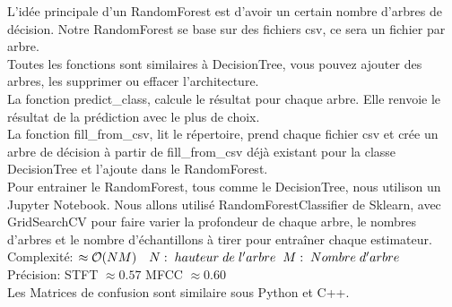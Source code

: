 \documentclass[10pt]{article}
\begin{document}
\begin{minipage}[t]{0.6\linewidth}
L'idée principale d'un RandomForest est d'avoir un certain nombre d'arbres de décision. Notre RandomForest se base sur des fichiers csv, ce sera un fichier par arbre.\\

Toutes les fonctions sont similaires à DecisionTree, vous pouvez ajouter des arbres, les supprimer ou effacer l'architecture.\\
La fonction predict\_class, calcule le résultat pour chaque arbre. Elle renvoie le résultat de la prédiction avec le plus de choix.\\
La fonction fill\_from\_csv, lit le répertoire, prend chaque fichier csv et crée un arbre de décision à partir de fill\_from\_csv déjà existant pour la classe DecisionTree et l'ajoute dans le RandomForest. \\

Pour entrainer le RandomForest, tous comme le DecisionTree, nous utilison un Jupyter Notebook. Nous allons utilisé RandomForestClassifier de Sklearn, avec GridSearchCV pour faire varier la profondeur de chaque arbre, le nombres d'arbres et le nombre d'échantillons à tirer  pour entraîner chaque estimateur.  \\

Complexité: $\approx \mathcal{O}(NM)\quad  N: \hspace{0.1cm} hauteur \hspace{0.1cm} de \hspace{0.1cm} l'arbre \hspace{0.2cm} M: \hspace{0.1cm} Nombre \hspace{0.1cm} d'arbre$ \\ 
Précision: STFT $\approx 0.57$ MFCC $\approx 0.60$ \\
Les Matrices de confusion sont similaire sous Python et C++.

\end{minipage}
\end{document}
